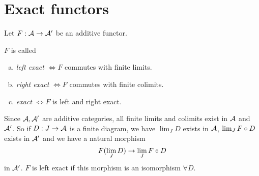\documentclass[a4paper]{report}
\begin{document}
\section{Exact functors}
Let $F: \mathcal{A} \to \mathcal{A}'$ be an additive functor.
\begin{defi}
  $F$ is called
  \begin{enumerate}[(a)]
    \item \emph{left exact} $\iff F$ commutes with finite limits.
    \item \emph{right exact} $\iff F$ commutes with finite colimits.
    \item \emph{exact} $\iff F$ is left and right exact.
  \end{enumerate}
\end{defi}
\begin{rem*}
  Since $\mathcal{A}, \mathcal{A}'$ are additive categories, all finite limits and colimits exist in $\mathcal{A}$ and $
  \mathcal{A}'$. So if $D: J \to \mathcal{A}$ is a finite diagram, we have $\lim_{J} D$ exists in $\mathcal{A}$, $\lim_{J} F \circ D$ exists in $\mathcal{A}'$ and we have a natural morphism \[F(\lim_{J} D) \to \lim_{J}F \circ D\]in $\mathcal{A}'$. $F$ is left exact if this morphism is an isomorphism $\forall D$.
\end{rem*}
\end{document}
